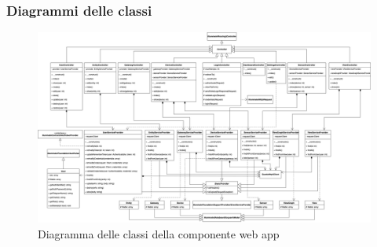 	\begin{landscape}
	\subsubsection{Diagrammi delle classi}%
		\begin{figure}[H]
			\centering
			\includegraphics[scale=0.350]{res/images/WEBAPP/ClassiWebApp.png}
			\caption{Diagramma delle classi della componente web app}
			\label{Diagramma 22}
		\end{figure}

\end{landscape}

